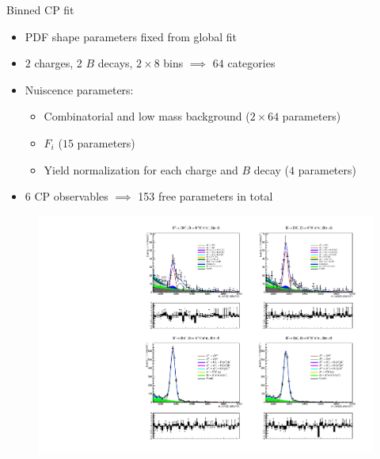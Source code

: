\documentclass{beamer}
\begin{document}
\begin{frame}{Binned CP fit}
  \begin{itemize}
    \setlength\itemsep{0.0em}
    \item{PDF shape parameters fixed from global fit}
    \item{$2$ charges, 2 $B$ decays, $2\times 8$ bins $\implies$ $64$ categories}
    \item{Nuiscence parameters:}
    \begin{itemize}
      \item{Combinatorial and low mass background ($2\times 64$ parameters)}
      \item{$F_i$ ($15$ parameters)}
      \item{Yield normalization for each charge and $B$ decay ($4$ parameters)}
    \end{itemize}
    \item{$6$ CP observables $\implies$ 153 free parameters in total}
  \end{itemize}
  \begin{figure}
    \includegraphics[width = 1.0\textwidth, clip = true, trim = {0 13cm 0 0}]{Plots/d2kkpipi_fiveL_binm5.pdf}
  \end{figure}
\end{frame}
\end{document}
